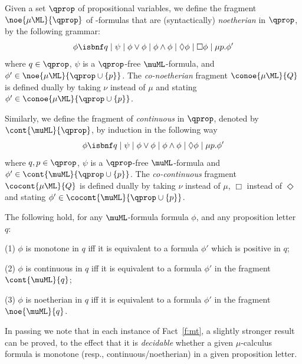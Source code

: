 \begin{definition}
Given a set $\qprop$ of propositional variables, we define the fragment 
$\noe{\mu\ML}{\qprop}$ of \muML-formulas that are (syntactically) 
\emph{noetherian} in $\qprop$, by the following grammar:
\begin{equation*}
   \phi \isbnf  q
   \mid \psi
   \mid \phi \lor \phi
   \mid \phi \land \phi
     \mid \Diamond \phi
       \mid \Box \phi
   \mid \mu p.\phi'
\end{equation*}
where $q \in \qprop$, $\psi$ is a $\qprop$-free $\muML$-formula, and 
$\phi' \in \noe{\mu\ML}{\qprop\cup\{p\}}$. 
The \emph{co-noetherian} fragment $\conoe{\mu\ML}{Q}$ is defined dually by 
taking $\nu$ instead of $\mu$ and stating $\phi' \in 
\conoe{\mu\ML}{\qprop\cup\{p\}}$.

Similarly, we define the fragment of \muML \emph{continuous} in $\qprop$, 
denoted by $\cont{\muML}{\qprop}$, by induction in the following way
\begin{equation*}
   \phi \isbnf  q
   \mid \psi
   \mid \phi \lor \phi
   \mid \phi \land \phi
   \mid \Diamond \phi
   \mid \mu p.\phi'
\end{equation*}
%
where $q,p \in \qprop$, $\psi$ is a $\qprop$-free $\muML$-formula and 
$\phi' \in \cont{\muML}{\qprop\cup\{p\}}$.
The  \emph{co-continuous} fragment $\cocont{\mu\ML}{Q}$ is defined dually 
by taking $\nu$ instead of $\mu$, $\Box$ instead of $\Diamond$ 
and stating $\phi' \in \cocont{\muML}{\qprop\cup\{p\}}$. 
\end{definition}

\begin{fact}
\label{f:mt}
The following hold, for any $\muML$-formula formula $\phi$, and any proposition
letter $q$:

(1) $\phi$ is monotone in $q$ iff it is equivalent to a formula $\phi'$
 which is positive in $q$;

(2) $\phi$ is continuous in $q$ iff it is equivalent to a formula $\phi'$
  in the fragment $\cont{\muML}{q}$;

(3) $\phi$ is noetherian in $q$ iff it is equivalent to a formula $\phi'$
   in the fragment $\noe{\muML}{q}$.
\end{fact}

In passing we note that in each instance of Fact~\ref{f:mt}, a slightly stronger
result can be proved, to the effect that it is \emph{decidable} whether a given
$\mu$-calculus formula is monotone (resp., continuous/noetherian) in a given
proposition letter.

